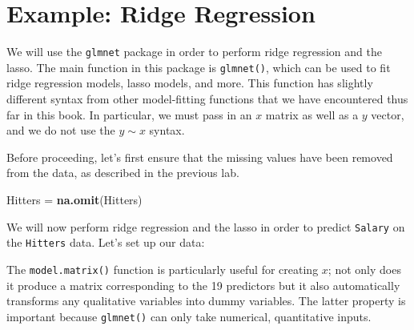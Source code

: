 \documentclass[
  openany]{book}
\newenvironment{Shaded}{\begin{snugshade}}{\end{snugshade}}
\newcommand{\CommentTok}[1]{\textcolor[rgb]{0.56,0.35,0.01}{\textit{#1}}}
\newcommand{\DecValTok}[1]{\textcolor[rgb]{0.00,0.00,0.81}{#1}}
\newcommand{\KeywordTok}[1]{\textcolor[rgb]{0.13,0.29,0.53}{\textbf{#1}}}
\newcommand{\NormalTok}[1]{#1}
\newcommand{\OperatorTok}[1]{\textcolor[rgb]{0.81,0.36,0.00}{\textbf{#1}}}
\newcommand{\StringTok}[1]{\textcolor[rgb]{0.31,0.60,0.02}{#1}}
\begin{document}
\hypertarget{example-ridge-regression}{%
\section{Example: Ridge Regression}\label{example-ridge-regression}}

We will use the \texttt{glmnet} package in order to perform ridge regression and
the lasso. The main function in this package is \texttt{glmnet()}, which can be used
to fit ridge regression models, lasso models, and more. This function has
slightly different syntax from other model-fitting functions that we have
encountered thus far in this book. In particular, we must pass in an \(x\)
matrix as well as a \(y\) vector, and we do not use the \(y \sim x\) syntax.

Before proceeding, let's first ensure that the missing values have
been removed from the data, as described in the previous lab.

\begin{Shaded}
\begin{Highlighting}[]
\NormalTok{Hitters =}\StringTok{ }\KeywordTok{na.omit}\NormalTok{(Hitters)}
\end{Highlighting}
\end{Shaded}

We will now perform ridge regression and the lasso in order to predict \texttt{Salary} on
the \texttt{Hitters} data. Let's set up our data:

\begin{Shaded}
\end{Shaded}

The \texttt{model.matrix()} function is particularly useful for creating \(x\); not only
does it produce a matrix corresponding to the 19 predictors but it also
automatically transforms any qualitative variables into dummy variables.
The latter property is important because \texttt{glmnet()} can only take numerical,
quantitative inputs.
\end{document}
